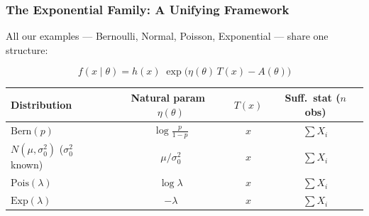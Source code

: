 \documentclass[aspectratio=169]{beamer}
\begin{document}
\begin{frame}
\frametitle{The Exponential Family: A Unifying Framework}

\small
All our examples --- Bernoulli, Normal, Poisson, Exponential --- share one structure:

$$\boxed{f(x \mid \theta) = h(x)\;\exp\!\Big(\eta(\theta)\,T(x) - A(\theta)\Big)}$$

\vspace{-0.1cm}
\begin{center}
\renewcommand{\arraystretch}{1.5}
\begin{tabular}{lccc}
  \textbf{Distribution} & \textbf{Natural param}~$\eta(\theta)$ & $T(x)$ & \textbf{Suff.\ stat} ($n$ obs) \\
  \hline
  $\text{Bern}(p)$ & $\log\frac{p}{1-p}$ & $x$ & $\sum X_i$ \\[1pt]
  $N(\mu,\sigma_0^2)$ \;($\sigma_0^2$ known) & $\mu/\sigma_0^2$ & $x$ & $\sum X_i$ \\[1pt]
  $\text{Pois}(\lambda)$ & $\log\lambda$ & $x$ & $\sum X_i$ \\[1pt]
  $\text{Exp}(\lambda)$ & $-\lambda$ & $x$ & $\sum X_i$ \\
  \hline
\end{tabular}
\end{center}

\vspace{0.1cm}
\begin{center}
\end{center}
\end{frame}
\end{document}
